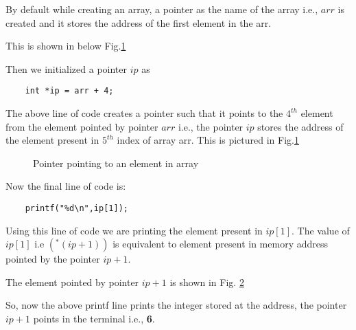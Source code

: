 \documentclass[journal,12pt,twocolumn]{IEEEtran}
\begin{document}
By default while creating an array, a pointer as the name of the array i.e., $arr$ is
created and it stores the address of the first element in the arr.

This is shown in below Fig.\ref{fig:ee18btech11034_2}

Then we initialized a pointer $ip$ as
\begin{lstlisting}
    int *ip = arr + 4;
\end{lstlisting}
The above line of code creates a pointer such that it points to the $4^{th}$ element from the
element pointed by pointer $arr$ i.e., the pointer $ip$ stores the address of the element
present in $5^{th}$ index of array arr. This is pictured in Fig.\ref{fig:ee18btech11034_2}
\begin{figure}[!ht]
    \begin{center}
        \resizebox{\columnwidth}{!}{}
    \end{center}
    \caption{Pointer pointing to an element in array}
    \label{fig:ee18btech11034_2}
\end{figure}

Now the final line of code is:
\begin{lstlisting}
    printf("%d\n",ip[1]);
\end{lstlisting}

Using this line of code we are printing the element present in $ip[1]$. The value of
$ip[1]$ i.e $(^{*}(ip+1))$ is equivalent to element present in memory address pointed by the pointer
$ip+1$.

The element pointed by pointer $ip+1$ is shown in Fig. \ref{fig:ee18btech11034_3}

\begin{figure}[!ht]
    \begin{center}
        \resizebox{\columnwidth}{!}{}
    \end{center}
    \caption{}
    \label{fig:ee18btech11034_3}
\end{figure}

So, now the above printf line prints the integer stored at the address, the pointer $ip+1$
points in the terminal i.e., \textbf{6}.
\end{document}

